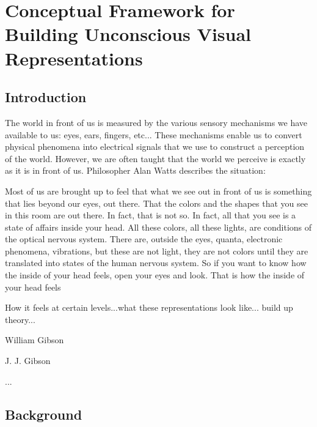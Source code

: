 \documentclass[a4paper,10pt,final]{ThesisStyle}
\begin{document}





\chapter{Conceptual Framework for Building Unconscious Visual Representations}
\label{ch:conceptual-visual}
\minitoc

\section{Introduction}

The world in front of us is measured by the various sensory mechanisms we have available to us: eyes, ears, fingers, etc... These mechanisms enable us to convert physical phenomena into electrical signals that we use to construct a perception of the world.  However, we are often taught that the world we perceive is exactly as it is in front of us.  Philosopher Alan Watts describes the situation:
\begin{quotationb}
Most of us are brought up to feel that what we see out in front of us is something that lies beyond our eyes, out there. That the colors and the shapes that you see in this room are out there. In fact, that is not so. In fact, all that you see is a state of affairs inside your head. All these colors, all these lights, are conditions of the optical nervous system. There are, outside the eyes, quanta, electronic phenomena, vibrations, but these are not light, they are not colors until they are translated into states of the human nervous system. So if you want to know how the inside of your head feels, open your eyes and look. That is how the inside of your head feels\\
\end{quotationb}
How it feels at certain levels...what these representations look like... build up theory... 


William Gibson

J. J. Gibson

... 

\section{Background}
\end{document}
